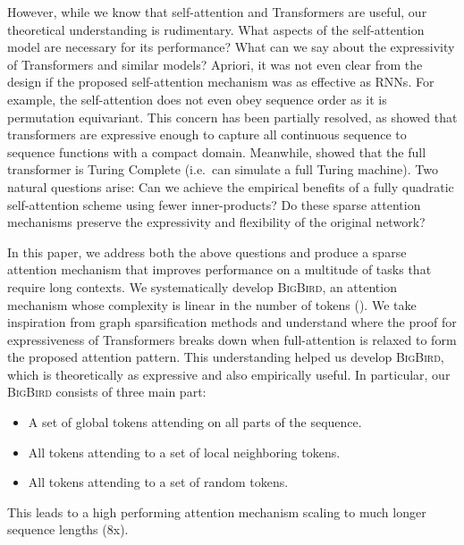 \documentclass{article}
\newcommand{\bigb}{\textsc{BigBird}\xspace}
\begin{document}
However, while we know that self-attention and Transformers are useful, our theoretical
understanding is rudimentary. What aspects of the self-attention model are necessary for its performance?
What can we say about the expressivity of Transformers and similar models? Apriori, it was not 
even clear from the  design if the proposed self-attention mechanism was as effective as RNNs. 
For example, the self-attention does not even obey sequence order as it is permutation equivariant. 
This concern has been partially resolved, as \citet{Yun19} showed that transformers are expressive 
enough to capture all continuous sequence to sequence functions with a compact domain. 
Meanwhile, \citet{Perez19} showed that the full  transformer is Turing Complete 
(i.e.~can simulate a full Turing machine). Two natural questions arise: Can we achieve the empirical 
benefits of a fully quadratic self-attention scheme using fewer inner-products? Do these 
sparse attention mechanisms preserve the expressivity and flexibility of the original network?

In this paper, we address both the above questions and produce a sparse attention mechanism  that
improves performance on a multitude of tasks that require long contexts.
We systematically develop \bigb, an attention mechanism whose complexity 
is linear in the number of tokens (). We take inspiration from graph 
sparsification methods and understand  where the proof for expressiveness of Transformers 
breaks down when full-attention is relaxed to form the proposed attention pattern. This understanding
helped us develop \bigb, which is theoretically as expressive and also empirically useful. 
In particular, our \bigb consists of three main part:

\begin{itemize}[leftmargin=6mm, itemsep=0mm, partopsep=0pt,parsep=0pt]
    \item A set of  global tokens attending on all parts of the sequence.
    \item All tokens attending to a set of  local neighboring tokens.
    \item All tokens attending to a set of  random tokens.
\end{itemize}
This leads to a high performing attention mechanism scaling to much longer sequence lengths (8x).
\end{document}
